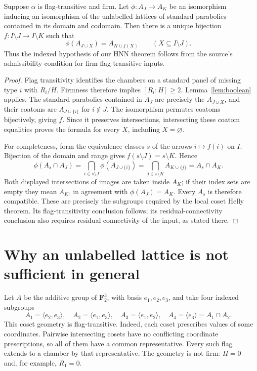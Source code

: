 \begin{corollary}\label{cor:firm}
Suppose $\alpha$ is flag-transitive and firm. Let
$\phi:A_J\longrightarrow A_K$ be an isomorphism inducing an isomorphism
of the unlabelled lattices of standard parabolics contained in its domain
and codomain. Then there is a unique bijection
$f:I\setminus J\longrightarrow I\setminus K$ such that
\[
 \phi(A_{J\cup X})=A_{K\cup f(X)}
 \qquad(X\subseteq I\setminus J).
\]
Thus the indexed hypothesis of our HNN theorem follows from the source's
admissibility condition for firm flag-transitive inputs.
\end{corollary}
\begin{proof}
Flag transitivity identifies the chambers on a standard panel of missing
type $i$ with $R_i/H$. Firmness therefore implies $[R_i:H]\geq2$.
Lemma~\ref{lem:boolean} applies. The standard parabolics contained in
$A_J$ are precisely the $A_{J\cup X}$, and their coatoms are
$A_{J\cup\{i\}}$ for $i\notin J$. The isomorphism permutes coatoms
bijectively, giving $f$. Since it preserves intersections, intersecting
these coatom equalities proves the formula for every $X$, including
$X=\varnothing$.

For completeness, form the equivalence classes $s$ of the arrows
$i\mapsto f(i)$ on $I$. Bijection of the domain and range gives
$f(s\setminus J)=s\setminus K$. Hence
\[
 \phi(A_s\cap A_J)
 =\bigcap_{i\in s\setminus J}\phi(A_{J\cup\{i\}})
 =\bigcap_{j\in s\setminus K}A_{K\cup\{j\}}
 =A_s\cap A_K.
\]
Both displayed intersections of images are taken inside $A_K$; if
their index sets are empty they mean $A_K$, in agreement with
$\phi(A_J)=A_K$. Every $A_s$ is therefore compatible. These are precisely the
subgroups required by the local coset Helly theorem. Its flag-transitivity
conclusion follows; its residual-connectivity conclusion also requires
residual connectivity of the input, as stated there.
\end{proof}

\section*{Why an unlabelled lattice is not sufficient in general}
Let $A$ be the additive group of $\mathbf F_2^3$, with basis
$e_1,e_2,e_3$, and take four indexed subgroups
\[
 A_1=\langle e_2,e_3\rangle,\quad
 A_2=\langle e_1,e_3\rangle,\quad
 A_3=\langle e_1,e_2\rangle,\quad
 A_4=\langle e_3\rangle=A_1\cap A_2.
\]
This coset geometry is flag-transitive. Indeed, each coset prescribes
values of some coordinates. Pairwise intersecting cosets have no
conflicting coordinate prescriptions, so all of them have a common
representative. Every such flag extends to a chamber by that representative.
The geometry is not firm: $H=0$ and, for example, $R_1=0$.

